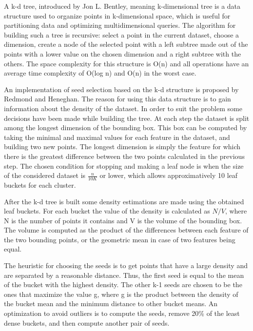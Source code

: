 \documentclass[12pt]{article}
\begin{document}
	A k-d tree, introduced by Jon L. Bentley\cite{KdTree}, meaning k-dimensional tree is a data structure used to organize points in k-dimensional space, which is useful for partitioning data and optimizing multidimensional queries. The algorithm for building such a tree is recursive: select a point in the current dataset, choose a dimension, create a node of the selected point with a left subtree made out of the points with a lower value on the chosen dimension and a right subtree with the others. The space complexity for this structure is O(n) and all operations have an average time complexity of O(log n) and O(n) in the worst case. 
	
	An implementation of seed selection based on the k-d structure is proposed by Redmond and Heneghan\cite{KdTreeKmeans}. The reason for using this data structure is to gain information about the density of the dataset. In order to suit the problem some decisions have been made while building the tree. At each step the dataset is split among the longest dimension of the bounding box. This box can be computed by taking the minimal and maximal values for each feature in the dataset, and building two new points. The longest dimension is simply the feature for which there is the greatest difference between the two points calculated in the previous step. The chosen condition for stopping and making a leaf node is when the size of the considered dataset is \(\frac{n}{10K}\) or lower, which allows approximatively 10 leaf buckets for each cluster.
	
	After the k-d tree is built some density estimations are made using the obtained leaf buckets. For each bucket the value of the density is calculated as \( N / V \), where N is the number of points it contains and V is the volume of the bounding box. The volume is computed as the product of the differences between each feature of the two bounding points, or the geometric mean in case of two features being equal. 
	
	The heuristic for choosing the seeds is to get points that have a large density and are separated by a reasonable distance. Thus, the first seed is equal to the mean of the bucket with the highest density. The other k-1 seeds are chosen to be the ones that maximize the value g, where g is the product between the density of the bucket mean and the minimum distance to other bucket means. An optimization to avoid outliers is to compute the seeds, remove 20\% of the least dense buckets, and then compute another pair of seeds.
\end{document}
